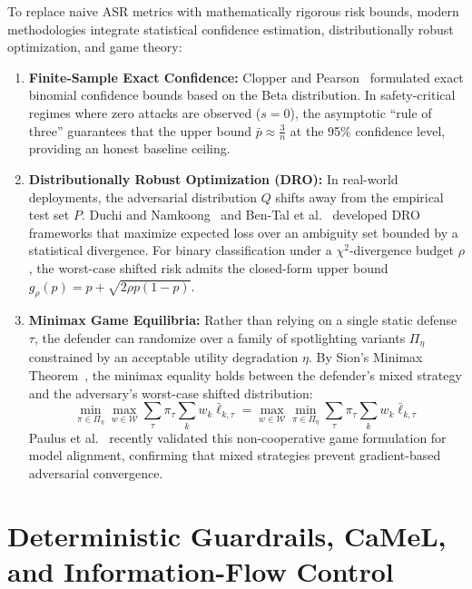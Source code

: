 To replace naive ASR metrics with mathematically rigorous risk bounds, modern methodologies integrate statistical confidence estimation, distributionally robust optimization, and game theory:
\begin{enumerate}
    \item \textbf{Finite-Sample Exact Confidence:} Clopper and Pearson~\cite{clopper1934} formulated exact binomial confidence bounds based on the Beta distribution. In safety-critical regimes where zero attacks are observed ($s = 0$), the asymptotic ``rule of three'' \cite{hanley1983} guarantees that the upper bound $\bar{p} \approx \frac{3}{n}$ at the 95\% confidence level, providing an honest baseline ceiling.
    \item \textbf{Distributionally Robust Optimization (DRO):} In real-world deployments, the adversarial distribution $Q$ shifts away from the empirical test set $P$. Duchi and Namkoong~\cite{duchi2021dro} and Ben-Tal et al.~\cite{bental2013robust} developed DRO frameworks that maximize expected loss over an ambiguity set bounded by a statistical divergence. For binary classification under a $\chi^2$-divergence budget $\rho$, the worst-case shifted risk admits the closed-form upper bound $g_\rho(p) = p + \sqrt{2\rho p(1 - p)}$.
    \item \textbf{Minimax Game Equilibria:} Rather than relying on a single static defense $\tau$, the defender can randomize over a family of spotlighting variants $\Pi_\eta$ constrained by an acceptable utility degradation $\eta$. By Sion's Minimax Theorem~\cite{sion1958minimax}, the minimax equality holds between the defender's mixed strategy and the adversary's worst-case shifted distribution:
    \begin{equation}
        \min_{\pi \in \Pi_\eta} \max_{w \in \mathcal{W}} \sum_\tau \pi_\tau \sum_k w_k \bar{\ell}_{k,\tau} = \max_{w \in \mathcal{W}} \min_{\pi \in \Pi_\eta} \sum_\tau \pi_\tau \sum_k w_k \bar{\ell}_{k,\tau}
    \end{equation}
    Paulus et al.~\cite{paulus2025safety} recently validated this non-cooperative game formulation for model alignment, confirming that mixed strategies prevent gradient-based adversarial convergence.
\end{enumerate}

\section[Deterministic Guardrails, CaMeL, and IFC]{Deterministic Guardrails, CaMeL, and Information-Flow Control}
\label{sec:rel_deterministic_guardrails}

